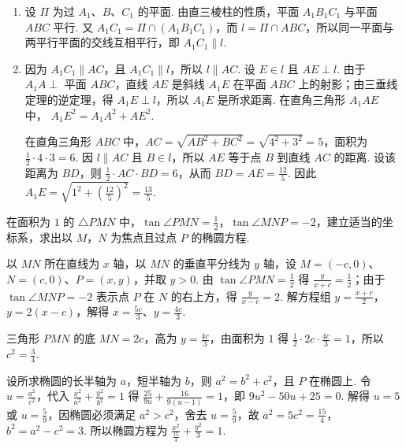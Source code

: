 \documentclass[UTF8,a4paper,oneside,11pt]{ctexbook}
\begin{document}
\begin{solution}
\begin{enumerate}
\item 设 \(\Pi\) 为过 \(A_1\)、\(B\)、\(C_1\) 的平面. 由直三棱柱的性质，平面 \(A_1B_1C_1\) 与平面 \(ABC\) 平行. 又 \(A_1C_1=\Pi\cap(A_1B_1C_1)\)，而 \(l=\Pi\cap ABC\)，所以同一平面与两平行平面的交线互相平行，即 \(A_1C_1\parallel l\).
\item 因为 \(A_1C_1\parallel AC\)，且 \(A_1C_1\parallel l\)，所以 \(l\parallel AC\). 设 \(E\in l\) 且 \(AE\perp l\). 由于 \(A_1A\perp\) 平面 \(ABC\)，直线 \(AE\) 是斜线 \(A_1E\) 在平面 \(ABC\) 上的射影；由三垂线定理的逆定理，得 \(A_1E\perp l\)，所以 \(A_1E\) 是所求距离. 在直角三角形 \(A_1AE\) 中，
\(A_1E^2=A_1A^2+AE^2\).

在直角三角形 \(ABC\) 中，\(AC=\sqrt{AB^2+BC^2}=\sqrt{4^2+3^2}=5\)，面积为 \(\frac{1}{2}\cdot4\cdot3=6\). 因 \(l\parallel AC\) 且 \(B\in l\)，所以 \(AE\) 等于点 \(B\) 到直线 \(AC\) 的距离. 设该距离为 \(BD\)，则 \(\frac{1}{2}\cdot AC\cdot BD=6\)，从而 \(BD=AE=\frac{12}{5}\). 因此
\(\displaystyle A_1E=\sqrt{1^2+\left(\frac{12}{5}\right)^2}=\frac{13}{5}\).
\end{enumerate}
\end{solution}

\begin{problem}
在面积为 \(1\) 的 \(\triangle PMN\) 中，\(\tan \angle PMN = \frac{1}{2}\)，\(\tan \angle MNP = -2\)，建立适当的坐标系，求出以 \(M\)，\(N\) 为焦点且过点 \(P\) 的椭圆方程.
\end{problem}

\begin{solution}
以 \(MN\) 所在直线为 \(x\) 轴，以 \(MN\) 的垂直平分线为 \(y\) 轴，设 \(M=(-c,0)\)、\(N=(c,0)\)、\(P=(x,y)\)，并取 \(y>0\). 由 \(\tan\angle PMN=\frac{1}{2}\) 得 \(\frac{y}{x+c}=\frac{1}{2}\)；由于 \(\tan\angle MNP=-2\) 表示点 \(P\) 在 \(N\) 的右上方，得 \(\frac{y}{x-c}=2\). 解方程组
\(\displaystyle y=\frac{x+c}{2}\)，\(\displaystyle y=2(x-c)\)，解得 \(x=\frac{5c}{3}\)、\(y=\frac{4c}{3}\).

三角形 \(PMN\) 的底 \(MN=2c\)，高为 \(y=\frac{4c}{3}\)，由面积为 \(1\) 得 \(\displaystyle\frac{1}{2}\cdot2c\cdot\frac{4c}{3}=1\)，所以 \(c^2=\frac{3}{4}\).

设所求椭圆的长半轴为 \(a\)，短半轴为 \(b\)，则 \(a^2=b^2+c^2\)，且 \(P\) 在椭圆上. 令 \(u=\frac{a^2}{c^2}\)，代入 \(\displaystyle\frac{x^2}{a^2}+\frac{y^2}{b^2}=1\) 得
\(\displaystyle\frac{25}{9u}+\frac{16}{9(u-1)}=1\)，即 \(9u^2-50u+25=0\). 解得 \(u=5\) 或 \(u=\frac{5}{9}\)，因椭圆必须满足 \(a^2>c^2\)，舍去 \(u=\frac{5}{9}\)，故 \(a^2=5c^2=\frac{15}{4}\)，\(b^2=a^2-c^2=3\). 所以椭圆方程为
\(\displaystyle\frac{x^2}{\frac{15}{4}}+\frac{y^2}{3}=1\).
\end{solution}
\end{document}
